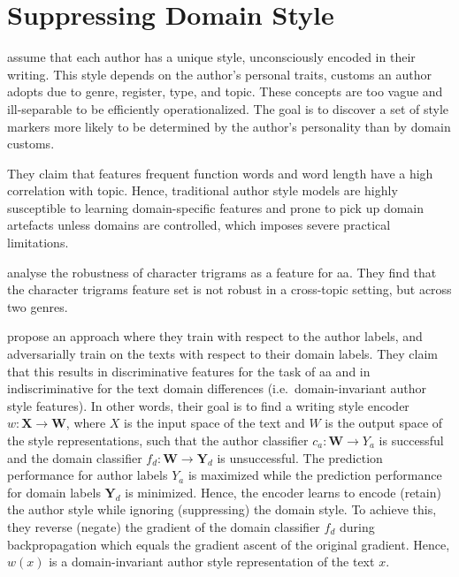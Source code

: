 \section{Suppressing Domain Style}

\citet{bischoff_importance_2020} assume that each author has a unique style, unconsciously encoded in their writing.
This style depends on the author's personal traits, customs an author adopts due to genre, register, type, and topic.
These concepts are too vague and ill-separable to be efficiently operationalized.
The goal is to discover a set of style markers more likely to be determined by the author's personality than by domain customs.

They claim that features frequent function words and word length have a high correlation with topic. 
Hence, traditional author style models are highly susceptible to learning domain-specific features and 
prone to pick up domain artefacts unless domains are controlled, 
which imposes severe practical limitations.

\citet{bischoff_importance_2020} analyse the robustness of character trigrams as a feature for \ac{aa}.
They find that the character trigrams feature set is not robust in a cross-topic setting, but across two genres.

\citet{bischoff_importance_2020} propose an approach where they train with respect to the author labels, 
and adversarially train on the texts with respect to their domain labels.
They claim that this results in discriminative features for the task of \ac{aa} and in 
indiscriminative for the text domain differences (i.e.\ domain-invariant author style features).
In other words, their goal is to find a writing style encoder $w: \textbf{X} \to \textbf{W}$, 
where $X$ is the input space of the text and $W$ is the output space of the style representations, 
such that the author classifier $c_a: \textbf{W} \to Y_a$ is successful and 
the domain classifier $f_d: \textbf{W} \to \textbf{Y}_d$ is unsuccessful.
The prediction performance for author labels $Y_a$ is maximized while the 
prediction performance for domain labels $\textbf{Y}_d$ is minimized.
Hence, the encoder learns to encode (retain) the author style while ignoring (suppressing) the domain style.
To achieve this, they reverse (negate) the gradient of the domain classifier $f_d$ during backpropagation 
which equals the gradient ascent of the original gradient.
Hence, $w(x)$ is a domain-invariant author style representation of the text $x$. 


